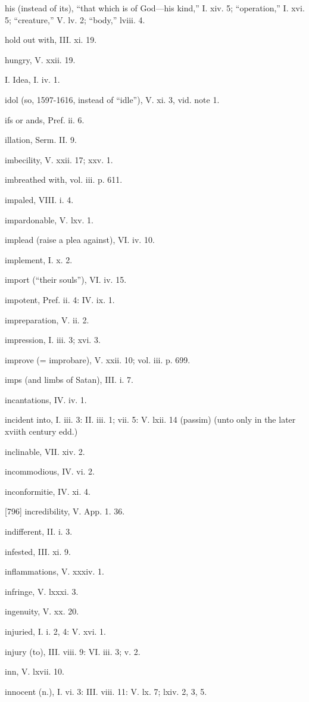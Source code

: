 his (instead of its), “that which is of God—his kind,” I. xiv. 5; “operation,” I. xvi. 5; “creature,” V. lv. 2; “body,” lviii. 4.

hold out with, III. xi. 19.

hungry, V. xxii. 19.

I.
Idea, I. iv. 1.

idol (so, 1597-1616, instead of “idle”), V. xi. 3, vid. note 1.

ifs or ands, Pref. ii. 6.

illation, Serm. II. 9.

imbecility, V. xxii. 17; xxv. 1.

imbreathed with, vol. iii. p. 611.

impaled, VIII. i. 4.

impardonable, V. lxv. 1.

implead (raise a plea against), VI. iv. 10.

implement, I. x. 2.

import (“their souls”), VI. iv. 15.

impotent, Pref. ii. 4: IV. ix. 1.

impreparation, V. ii. 2.

impression, I. iii. 3; xvi. 3.

improve (= improbare), V. xxii. 10; vol. iii. p. 699.

imps (and limbs of Satan), III. i. 7.

incantations, IV. iv. 1.

incident into, I. iii. 3: II. iii. 1; vii. 5: V. lxii. 14 (passim) (unto only in the later xviith century edd.)

inclinable, VII. xiv. 2.

incommodious, IV. vi. 2.

inconformitie, IV. xi. 4.

[796]
incredibility, V. App. 1. 36.

indifferent, II. i. 3.

infested, III. xi. 9.

inflammations, V. xxxiv. 1.

infringe, V. lxxxi. 3.

ingenuity, V. xx. 20.

injuried, I. i. 2, 4: V. xvi. 1.

injury (to), III. viii. 9: VI. iii. 3; v. 2.

inn, V. lxvii. 10.

innocent (n.), I. vi. 3: III. viii. 11: V. lx. 7; lxiv. 2, 3, 5.

